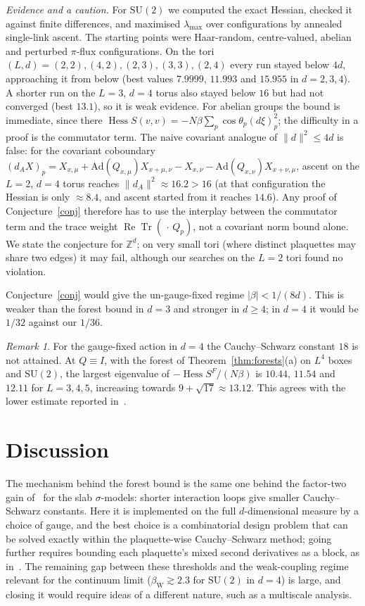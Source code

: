 \documentclass[11pt]{amsart}
\theoremstyle{definition}
\theoremstyle{remark}
\newtheorem{remark}[theorem]{Remark}
\newcommand{\Tr}{\operatorname{Tr}}
\renewcommand{\Re}{\operatorname{Re}}
\newcommand{\Hess}{\operatorname{Hess}}
\newcommand{\SU}{\mathrm{SU}}
\begin{document}
\noindent\emph{Evidence and a caution.} For $\SU(2)$ we computed the exact Hessian, checked it against finite
differences, and maximised $\lambda_{\max}$ over configurations by annealed single-link ascent. The starting points
were Haar-random, centre-valued, abelian and perturbed $\pi$-flux configurations. On the tori $(L,d)=(2,2),(4,2),(2,3),(3,3),(2,4)$
every run stayed below $4d$, approaching it from below (best values $7.9999$, $11.993$ and $15.955$ in
$d=2,3,4$). A shorter run on the $L=3$, $d=4$ torus also stayed below $16$ but had not converged (best $13.1$),
so it is weak evidence. For abelian groups the bound is immediate, since there
$\Hess S(v,v)=-N\beta\sum_p\cos\theta_p(d\xi)_p^2$; the difficulty in a proof is the commutator term. The naive
covariant analogue of $\|d\|^2\le4d$ is false: for the covariant coboundary
$(d_AX)_p=X_{x,\mu}+\mathrm{Ad}(Q_{x,\mu})X_{x+\mu,\nu}-X_{x,\nu}-\mathrm{Ad}(Q_{x,\nu})X_{x+\nu,\mu}$, ascent on the
$L=2$, $d=4$ torus reaches $\|d_A\|^2\approx16.2>16$ (at that configuration the Hessian is only $\approx8.4$, and ascent
started from it reaches $14.6$). Any proof of Conjecture~\ref{conj} therefore has to use the
interplay between the commutator term and the trace weight $\Re\Tr(\,\cdot\,Q_p)$, not a covariant norm bound alone.
We state the conjecture for $\mathbb{Z}^d$; on very small tori (where distinct plaquettes may share two edges) it may
fail, although our searches on the $L=2$ tori found no violation.

Conjecture~\ref{conj} would give the un-gauge-fixed regime $|\beta|<1/(8d)$. This is weaker than the forest bound in
$d=3$ and stronger in $d\ge4$; in $d=4$ it would be $1/32$ against our $1/36$.

\begin{remark}\label{rem:identity}
For the gauge-fixed action in $d=4$ the Cauchy--Schwarz constant $18$ is not attained. At $Q\equiv I$, with the
forest of Theorem~\ref{thm:forests}(a) on $L^4$ boxes and $\SU(2)$, the largest eigenvalue of $-\Hess S^F/(N\beta)$ is
$10.44$, $11.54$ and $12.11$ for $L=3,4,5$, increasing towards $9+\sqrt{17}\approx13.12$. This agrees with the lower
estimate reported in~\cite{BBL}.
\end{remark}

\section{Discussion}

The mechanism behind the forest bound is the same one behind the factor-two gain of~\cite{CNS} for the slab
$\sigma$-models: shorter interaction loops give smaller Cauchy--Schwarz constants. Here it is implemented on the full
$d$-dimensional measure by a choice of gauge, and the best choice is a combinatorial design problem that can be solved
exactly within the plaquette-wise Cauchy--Schwarz method; going further requires bounding
each plaquette's mixed second derivatives as a block, as in~\cite{BBL}. The remaining gap between these thresholds and the weak-coupling regime relevant for the continuum limit
($\beta_{\mathrm W}\gtrsim 2.3$ for $\SU(2)$ in $d=4$) is large, and closing it would require ideas of a different
nature, such as a multiscale analysis.
\end{document}
